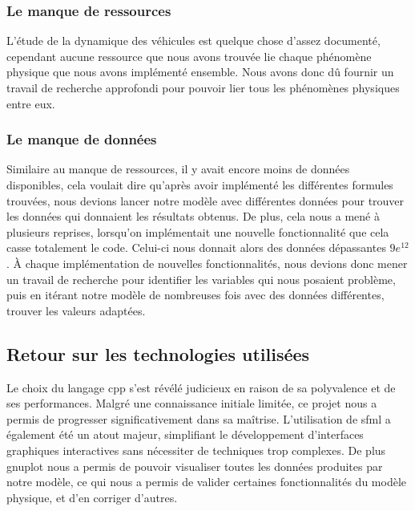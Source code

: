 \subsubsection{Le manque de ressources}\label{subsubsec:manque-ressources}
L'étude de la dynamique des véhicules est quelque chose d'assez documenté, cependant aucune ressource que nous avons trouvée lie chaque phénomène physique que nous avons implémenté ensemble.
Nous avons donc dû fournir un travail de recherche approfondi pour pouvoir lier tous les phénomènes physiques entre eux.

\subsubsection{Le manque de données}\label{subsubsec:manque-data}
Similaire au manque de ressources, il y avait encore moins de données disponibles, cela voulait dire qu'après avoir implémenté les différentes formules trouvées, nous devions lancer notre modèle avec différentes données pour trouver les données qui donnaient les résultats obtenus.
De plus, cela nous a mené à plusieurs reprises, lorsqu'on implémentait une nouvelle fonctionnalité que cela casse totalement le code.
Celui-ci nous donnait alors des données dépassantes $9e^{12}$.
À chaque implémentation de nouvelles fonctionnalités, nous devions donc mener un travail de recherche pour identifier les variables qui nous posaient problème, puis en itérant notre modèle de nombreuses fois avec des données différentes, trouver les valeurs adaptées.

\subsection{Retour sur les technologies utilisées}\label{subsec:retour-sur-les-technologies-utilisees}
Le choix du langage \gls{cpp} s'est révélé judicieux en raison de sa polyvalence et de ses performances.
Malgré une connaissance initiale limitée, ce projet nous a permis de progresser significativement dans sa maîtrise.
L'utilisation de \gls{sfml} a également été un atout majeur, simplifiant le développement d'interfaces graphiques interactives sans nécessiter de techniques trop complexes.
De plus \gls{gnuplot} nous a permis de pouvoir visualiser toutes les données produites par notre modèle, ce qui nous a permis de valider certaines fonctionnalités du modèle physique, et d'en corriger d'autres.





